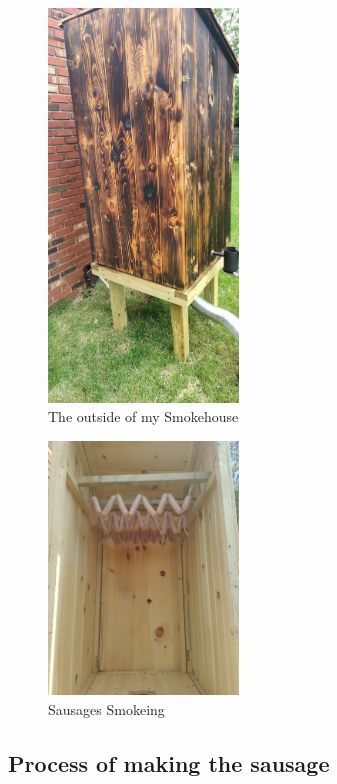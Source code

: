 \documentclass[letterpaper,11pt,leqno]{article}
\begin{document}
 \begin{figure}[!htb]
	\centering
	\includegraphics[width=0.45\textwidth]{Figures/Messenger_creation_8ca9e75e-8d85-4b6f-bd27-b4976f07179f.png}
	\caption{The outside of my Smokehouse}
	\label{Smoker}
\end{figure}
\begin{figure}[!htb]
	\centering
	\includegraphics[width=0.45\textwidth]{Figures/2024-04-26-11-13-05-315.jpg}
	\caption{Sausages Smokeing}
	\label{SmokingSausage}
\end{figure}

\subsection{Process of making the sausage}
\end{document}
